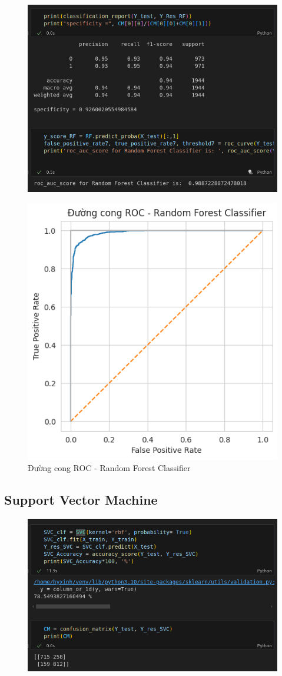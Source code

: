 \documentclass[11pt]{article}
\begin{document}
	\begin{figure}[H]
		\centering
		\includegraphics[width=0.7\linewidth]{RandomForestClassifier/screenshot009}
		\caption{}
		\label{fig:screenshot009}
	\end{figure}
	
	\begin{figure}[H]
		\centering
		\includegraphics[width=0.7\linewidth]{RandomForestClassifier/DuongCongROC}
		\caption{Đường cong ROC - Random Forest Classifier}
		\label{fig:duongcongroc}
	\end{figure}
	
	\subsection{Support Vector Machine}
	
	\begin{figure}[H]
		\centering
		\includegraphics[width=0.7\linewidth]{SVC/screenshot010}
		\caption{}
		\label{fig:screenshot010}
	\end{figure}
	
\end{document}
